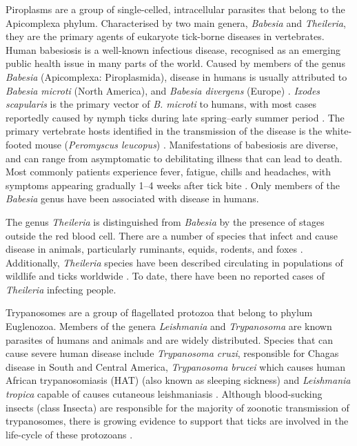 \documentclass[a4paper, nobind]{templates/ociamthesis}
\begin{document}
Piroplasms are a group of single-celled, intracellular parasites that belong to the Apicomplexa phylum.
Characterised by two main genera, \emph{Babesia} and \emph{Theileria}, they are the primary agents of eukaryote tick-borne diseases in vertebrates.
Human babesiosis is a well-known infectious disease, recognised as an emerging public health issue in many parts of the world.
Caused by members of the genus \emph{Babesia} (Apicomplexa: Piroplasmida), disease in humans is usually attributed to \emph{Babesia microti} (North America), and \emph{Babesia divergens} (Europe) \autocite{vannierHumanBabesiosis2012}.
\emph{Ixodes scapularis} is the primary vector of \emph{B. microti} to humans, with most cases reportedly caused by nymph ticks during late spring--early summer period \autocite{spielmanEcologyIxodesDamminiborne1985,swansonCoinfectionsAcquiredIxodes2006}.
The primary vertebrate hosts identified in the transmission of the disease is the white-footed mouse (\emph{Peromyscus leucopus}) \autocite{spielmanEcologyIxodesDamminiborne1985}.
Manifestations of babesiosis are diverse, and can range from asymptomatic to debilitating illness that can lead to death.
Most commonly patients experience fever, fatigue, chills and headaches, with symptoms appearing gradually 1--4 weeks after tick bite \autocite{vannierHumanBabesiosis2008}.
Only members of the \emph{Babesia} genus have been associated with disease in humans.

The genus \emph{Theileria} is distinguished from \emph{Babesia} by the presence of stages outside the red blood cell.
There are a number of species that infect and cause disease in animals, particularly ruminants, equids, rodents, and foxes \autocite{almazanBabesiosisTheileriosisNorth2022}.
Additionally, \emph{Theileria} species have been described circulating in populations of wildlife and ticks worldwide \autocite{mansReviewTheileriaDiagnostics2015,wattsTheileriaOrientalisReview2016}.
To date, there have been no reported cases of \emph{Theileria} infecting people.

Trypanosomes are a group of flagellated protozoa that belong to phylum Euglenozoa.
Members of the genera \emph{Leishmania} and \emph{Trypanosoma} are known parasites of humans and animals and are widely distributed.
Species that can cause severe human disease include \emph{Trypanosoma cruzi}, responsible for Chagas disease in South and Central America, \emph{Trypanosoma brucei} which causes human African trypanosomiasis (HAT) (also known as sleeping sickness) and \emph{Leishmania tropica} capable of causes cutaneous leishmaniasis \autocite{kauferReviewSystematicsSpecies2020}.
Although blood-sucking insects (class Insecta) are responsible for the majority of zoonotic transmission of trypanosomes, there is growing evidence to support that ticks are involved in the life-cycle of these protozoans \autocite{morzariaTransmissionTrypanosomaSp1986,thekisoeTrypanosomeSpeciesIsolated2007}.
\end{document}
